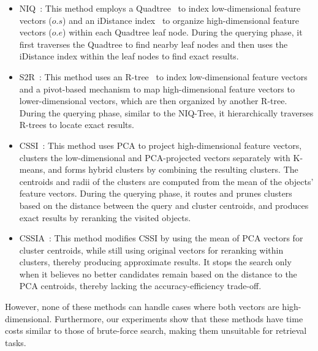\begin{itemize}[leftmargin=*]
    \item \textsf{NIQ~\cite{qianSemanticawareTopkSpatial2018}}: This method employs a Quadtree~\cite{finkelQuadTreesData1974} to index low-dimensional feature vectors ($o.s$) and an iDistance index~\cite{Jagadishidistance2005} to organize high-dimensional feature vectors ($o.e$) within each Quadtree leaf node. During the querying phase, it first traverses the Quadtree to find nearby leaf nodes and then uses the iDistance index within the leaf nodes to find exact results.
    \item \textsf{S2R~\cite{chenS2RtreePivotbasedIndexing2020}}: This method uses an R-tree~\cite{beckmann1990r} to index low-dimensional feature vectors and a pivot-based mechanism to map high-dimensional feature vectors to lower-dimensional vectors, which are then organized by another R-tree. During the querying phase, similar to the NIQ-Tree, it hierarchically traverses R-trees to locate exact results.
    \item \textsf{CSSI~\cite{DBLP:conf/edbt/TheodoropoulosN24}}: This method uses PCA to project high-dimensional feature vectors, clusters the low-dimensional and PCA-projected vectors separately with K-means, and forms hybrid clusters by combining the resulting clusters. The centroids and radii of the clusters are computed from the mean of the objects' feature vectors. During the querying phase, it routes and prunes clusters based on the distance between the query and cluster centroids, and produces exact results by reranking the visited objects.
    \item \textsf{CSSIA~\cite{DBLP:conf/edbt/TheodoropoulosN24}}: This method modifies CSSI by using the mean of PCA vectors for cluster centroids, while still using original vectors for reranking within clusters, thereby producing approximate results. It stops the search only when it believes no better candidates remain based on the distance to the PCA centroids, thereby lacking the accuracy-efficiency trade-off.
\end{itemize}
However, none of these methods can handle cases where both vectors are high-dimensional. Furthermore, our experiments show that these methods have time costs similar to those of brute-force search, making them unsuitable for retrieval tasks. 